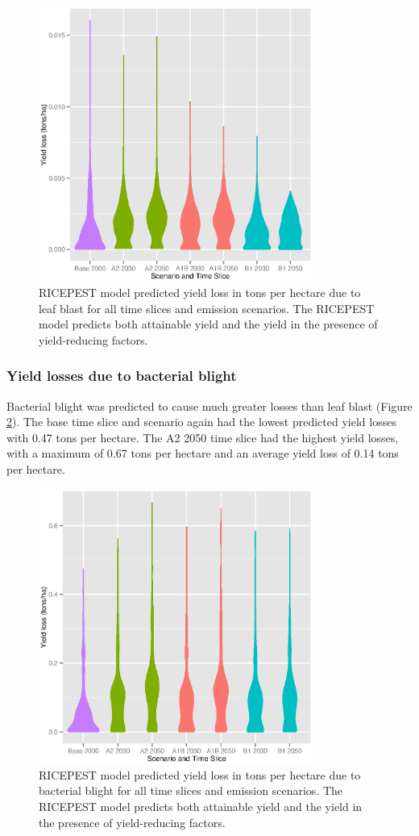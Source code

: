 \documentclass[preprint,12pt]{elsarticle}
\begin{document}
\begin{figure}[H]
  \includegraphics[width = 90mm]{Figures/LB_Losses_Violin}
  \caption{RICEPEST model predicted yield loss in tons per hectare due to leaf blast for all time slices and emission scenarios. The RICEPEST model predicts both attainable yield and the yield in the presence of yield-reducing factors.}
  \label{LB_Losses_Violin}
\end{figure}

\subsubsection{Yield losses due to bacterial blight}
Bacterial blight was predicted to cause much greater losses than leaf blast (Figure \ref{BB_Losses_Violin}). The base time slice and scenario again had the lowest predicted yield losses with 0.47 tons per hectare. The A2 2050 time slice had the highest yield losses, with a maximum of 0.67 tons per hectare and an average yield loss of 0.14 tons per hectare.

\begin{figure}[H]
  \includegraphics[width = 90mm]{Figures/BB_Losses_Violin}
  \caption{RICEPEST model predicted yield loss in tons per hectare due to bacterial blight for all time slices and emission scenarios. The RICEPEST model predicts both attainable yield and the yield in the presence of yield-reducing factors.}
  \label{BB_Losses_Violin}
\end{figure}
\end{document}
